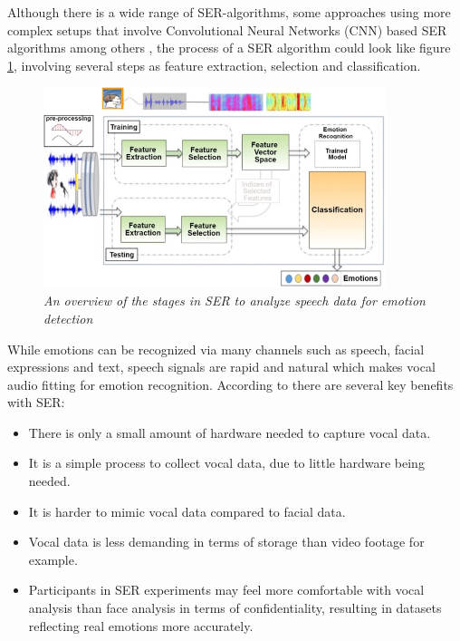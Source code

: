  Although there is a wide range of SER-algorithms, some approaches using more complex setups that involve Convolutional Neural Networks (CNN) based SER algorithms among others \autocite{Ri2023}, the process of a SER algorithm could look like figure \ref{fig:stages-SER}, involving several steps as feature extraction, selection and classification.


\begin{figure}[ht]
    \centering
    \includegraphics[width=10cm]{png/Figure 4-Stages in SER.jpg}
    \caption{\textit{An overview of the stages in SER to analyze speech data for emotion detection} \autocite{LGENSNMEZ2024}}
    \label{fig:stages-SER}
\end{figure}
 

 While emotions can be recognized via many channels such as speech, facial expressions and text, speech signals are rapid and natural which makes vocal audio fitting for emotion recognition. According to \autocite{LGENSNMEZ2024} there are several key benefits with SER:

\begin{itemize}
    \item There is only a small amount of hardware needed to capture vocal data.
    
    \item It is a simple process to collect vocal data, due to little hardware being needed.
    
    \item It is harder to mimic vocal data compared to facial data.

    \item Vocal data is less demanding in terms of storage than video footage for example.

    \item Participants in SER experiments may feel more comfortable with vocal analysis than face analysis in terms of confidentiality, resulting in datasets reflecting real emotions more accurately.
\end{itemize}

